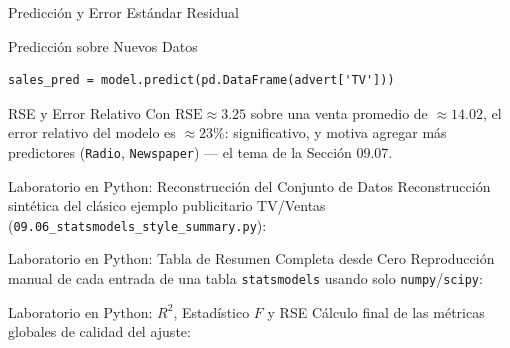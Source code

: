 \documentclass[10pt, aspectratio=169]{beamer}
\begin{document}
\begin{frame}[fragile]{Predicción y Error Estándar Residual}
  \footnotesize
  \begin{block}{Predicción sobre Nuevos Datos}
    \begin{verbatim}
sales_pred = model.predict(pd.DataFrame(advert['TV']))
    \end{verbatim}
  \end{block}
  \pause

  \vspace{0.1cm}
  \begin{alertblock}{RSE y Error Relativo}
    Con $\text{RSE}\approx3.25$ sobre una venta promedio de $\approx14.02$, el error relativo del modelo es $\approx23\%$: significativo, y motiva agregar más predictores (\texttt{Radio}, \texttt{Newspaper}) --- el tema de la Sección 09.07.
  \end{alertblock}
\end{frame}

\begin{frame}[fragile]{Laboratorio en Python: Reconstrucción del Conjunto de Datos}
  \scriptsize
  Reconstrucción sintética del clásico ejemplo publicitario TV/Ventas (\texttt{09.06\_statsmodels\_style\_summary.py}):
  {
  }
\end{frame}

\begin{frame}[fragile]{Laboratorio en Python: Tabla de Resumen Completa desde Cero}
  \scriptsize
  Reproducción manual de cada entrada de una tabla \texttt{statsmodels} usando solo \texttt{numpy}/\texttt{scipy}:
  {
  }
\end{frame}

\begin{frame}[fragile]{Laboratorio en Python: $R^2$, Estadístico $F$ y RSE}
  \scriptsize
  Cálculo final de las métricas globales de calidad del ajuste:
  {
  }
\end{frame}
\end{document}
